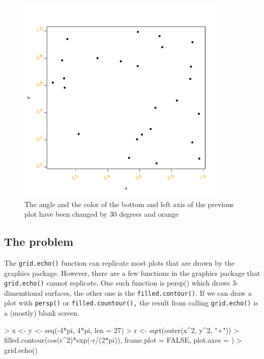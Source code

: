 \documentclass[a4paper,10pt]{article}
\begin{document}
\begin{figure}[h]
\begin{center}
  \includegraphics[height = 10cm, width = 10cm]{figure/report_basic_demo_4.pdf}
  \caption{The angle and the color of the bottom and left axis of the previous plot have been changed by 30 degrees and orange}
  	\label{figure3}
\end{center}
\end{figure}


\subsection{The problem}
The \texttt{grid.echo()} function can replicate most plots that are drawn by the graphics package. However, there are a few functions in the graphics package that \texttt{grid.echo()} cannot replicate. One such function is persp() which draws 3-dimemtional surfaces, the other one is the \texttt{filled.contour()}. If we can draw a plot with \texttt{persp()} or \texttt{filled.countour(),} the result from calling \texttt{grid.echo()} is a (mostly) blank screen. \\


\begin{Schunk}
\begin{Sinput}
> x <- y <- seq(-4*pi, 4*pi, len = 27)
> r <- sqrt(outer(x^2, y^2, "+"))
> filled.contour(cos(r^2)*exp(-r/(2*pi)), frame.plot = FALSE, plot.axes = {})
> grid.echo()
\end{Sinput}
\end{Schunk}
\end{document}
